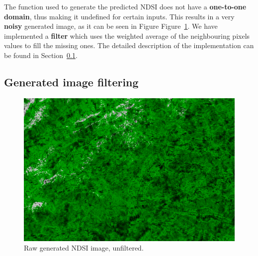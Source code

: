 \documentclass[12pt, a4paper]{report}
\begin{document}
	\par The function used to generate the predicted NDSI does not have a \textbf{one-to-one domain}, thus making it undefined for certain inputs. This results in a very \textbf{noisy} generated image, as it can be seen in Figure Figure~\ref{fig:unfiltered}. We have implemented a \textbf{filter} which uses the weighted average of the neighbouring pixels values to fill the missing ones. The detailed description of the implementation can be found in Section~\ref{seq:filter}.
	
	\subsection{Generated image filtering}
	\label{seq:filter}
	
	\begin{figure}[h!]
		\centering
		\includegraphics[width=\linewidth]{../images/LC81940282015363LGN02_Motion Predicted NDSI_unfiltered_small.png}
		\caption{Raw generated NDSI image, unfiltered.}
		\label{fig:unfiltered}
	\end{figure}
\end{document}
